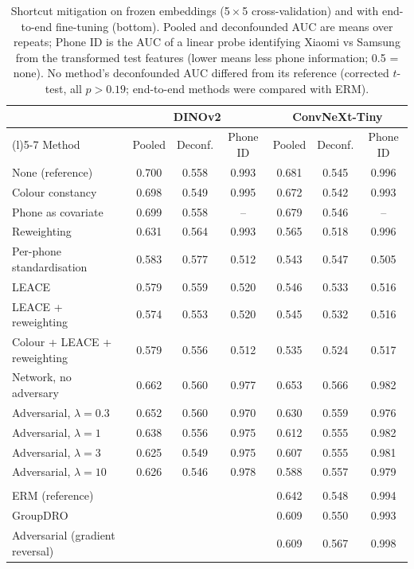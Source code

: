 \documentclass[preprint,12pt]{elsarticle}
\begin{document}
\begin{table}[!htbp]
\centering
\footnotesize
\caption{Shortcut mitigation on frozen embeddings (5\,$\times$\,5 cross-validation) and with end-to-end fine-tuning (bottom). Pooled and deconfounded AUC are means over repeats; Phone ID is the AUC of a linear probe identifying Xiaomi vs Samsung from the transformed test features (lower means less phone information; 0.5 = none). No method's deconfounded AUC differed from its reference (corrected $t$-test, all $p > 0.19$; end-to-end methods were compared with ERM).}
\label{tab:mitigation}
\setlength{\tabcolsep}{3.2pt}
\begin{tabular}{@{}>{\raggedright\arraybackslash}p{3.9cm}cccccc@{}}
\toprule
& \multicolumn{3}{c}{DINOv2} & \multicolumn{3}{c}{ConvNeXt-Tiny} \\
\cmidrule(lr){2-4}\cmidrule(l){5-7}
Method & Pooled & Deconf. & Phone ID & Pooled & Deconf. & Phone ID \\
\midrule
None (reference) & 0.700 & 0.558 & 0.993 & 0.681 & 0.545 & 0.996 \\
Colour constancy & 0.698 & 0.549 & 0.995 & 0.672 & 0.542 & 0.993 \\
Phone as covariate & 0.699 & 0.558 & -- & 0.679 & 0.546 & -- \\
Reweighting & 0.631 & 0.564 & 0.993 & 0.565 & 0.518 & 0.996 \\
Per-phone standardisation & 0.583 & 0.577 & 0.512 & 0.543 & 0.547 & 0.505 \\
LEACE & 0.579 & 0.559 & 0.520 & 0.546 & 0.533 & 0.516 \\
LEACE + reweighting & 0.574 & 0.553 & 0.520 & 0.545 & 0.532 & 0.516 \\
Colour + LEACE + reweighting & 0.579 & 0.556 & 0.512 & 0.535 & 0.524 & 0.517 \\
Network, no adversary & 0.662 & 0.560 & 0.977 & 0.653 & 0.566 & 0.982 \\
Adversarial, $\lambda = 0.3$ & 0.652 & 0.560 & 0.970 & 0.630 & 0.559 & 0.976 \\
Adversarial, $\lambda = 1$ & 0.638 & 0.556 & 0.975 & 0.612 & 0.555 & 0.982 \\
Adversarial, $\lambda = 3$ & 0.625 & 0.549 & 0.975 & 0.607 & 0.555 & 0.981 \\
Adversarial, $\lambda = 10$ & 0.626 & 0.546 & 0.978 & 0.588 & 0.557 & 0.979 \\
\addlinespace
\multicolumn{7}{@{}l}{\textit{End-to-end fine-tuning, ConvNeXt-Tiny (one repeat; early stopping on validation deconfounded AUC)}} \\
ERM (reference) & & & & 0.642 & 0.548 & 0.994 \\
GroupDRO & & & & 0.609 & 0.550 & 0.993 \\
Adversarial (gradient reversal) & & & & 0.609 & 0.567 & 0.998 \\
\bottomrule
\end{tabular}
\end{table}
\end{document}
